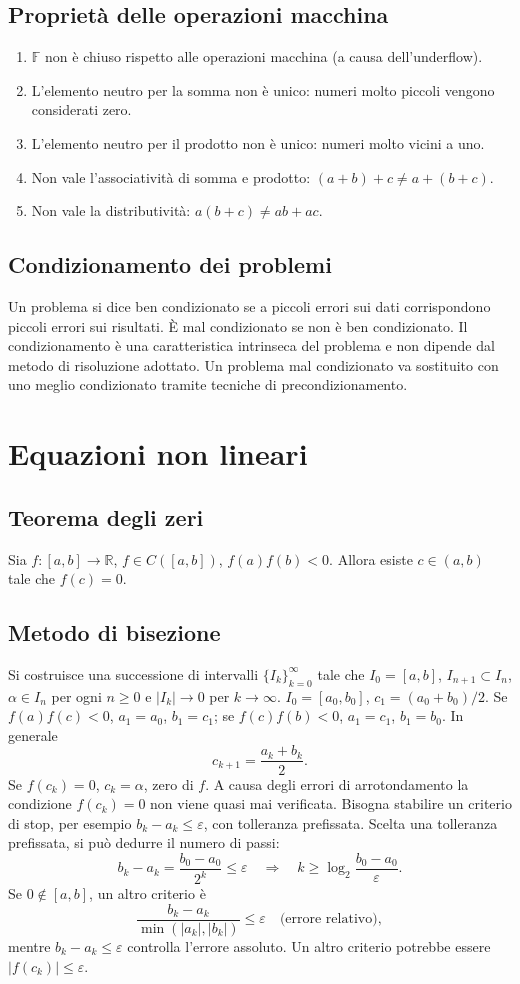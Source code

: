 \documentclass[11pt,a4paper]{article}
\newcommand{\R}{\mathbb R}\newcommand{\F}{\mathbb F}\newcommand{\tr}{\operatorname{tr}}\newcommand{\ar}{\operatorname{arr}}\newcommand{\fl}{\operatorname{fl}}
\newcommand{\pagina}[1]{\clearpage}
\begin{document}
\subsection*{Proprietà delle operazioni macchina}
\begin{enumerate}\item $\F$ non è chiuso rispetto alle operazioni macchina (a causa dell'underflow).\item L'elemento neutro per la somma non è unico: numeri molto piccoli vengono considerati zero.\item L'elemento neutro per il prodotto non è unico: numeri molto vicini a uno.\item Non vale l'associatività di somma e prodotto: $(a+b)+c\ne a+(b+c)$.\item Non vale la distributività: $a(b+c)\ne ab+ac$.\end{enumerate}
\subsection*{Condizionamento dei problemi}
Un problema si dice ben condizionato se a piccoli errori sui dati corrispondono piccoli errori sui risultati. È mal condizionato se non è ben condizionato. Il condizionamento è una caratteristica intrinseca del problema e non dipende dal metodo di risoluzione adottato. Un problema mal condizionato va sostituito con uno meglio condizionato tramite tecniche di precondizionamento.
\pagina{9}\section{Equazioni non lineari}
\subsection*{Teorema degli zeri}
Sia $f:[a,b]\to\R$, $f\in C([a,b])$, $f(a)f(b)<0$. Allora esiste $c\in(a,b)$ tale che $f(c)=0$.
\subsection*{Metodo di bisezione}
Si costruisce una successione di intervalli $\{I_k\}_{k=0}^\infty$ tale che $I_0=[a,b]$, $I_{n+1}\subset I_n$, $\alpha\in I_n$ per ogni $n\ge0$ e $|I_k|\to0$ per $k\to\infty$.
$I_0=[a_0,b_0]$, $c_1=(a_0+b_0)/2$. Se $f(a)f(c)<0$, $a_1=a_0$, $b_1=c_1$; se $f(c)f(b)<0$, $a_1=c_1$, $b_1=b_0$. In generale
\[c_{k+1}=\frac{a_k+b_k}{2}.\]
Se $f(c_k)=0$, $c_k=\alpha$, zero di $f$. A causa degli errori di arrotondamento la condizione $f(c_k)=0$ non viene quasi mai verificata. Bisogna stabilire un criterio di stop, per esempio $b_k-a_k\le\varepsilon$, con tolleranza prefissata.
\pagina{10}
Scelta una tolleranza prefissata, si può dedurre il numero di passi:
\[b_k-a_k=\frac{b_0-a_0}{2^k}\le\varepsilon\quad\Longrightarrow\quad k\ge\log_2\frac{b_0-a_0}{\varepsilon}.\]
Se $0\notin[a,b]$, un altro criterio è
\[\frac{b_k-a_k}{\min(|a_k|,|b_k|)}\le\varepsilon\quad\text{(errore relativo)},\]
mentre $b_k-a_k\le\varepsilon$ controlla l'errore assoluto. Un altro criterio potrebbe essere $|f(c_k)|\le\varepsilon$.
\end{document}
